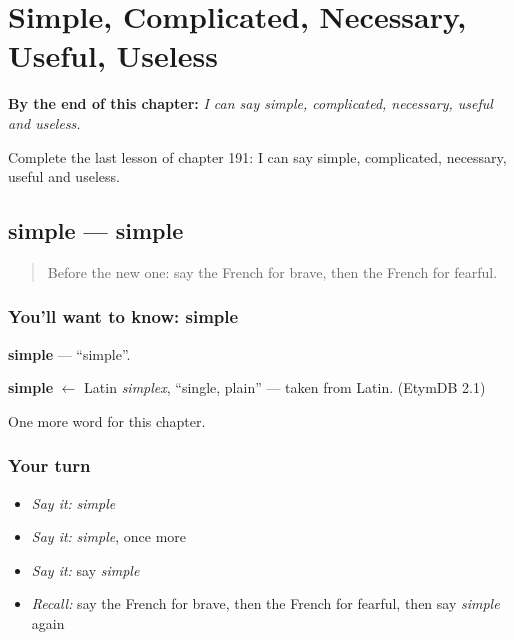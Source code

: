 
\chapter{Simple, Complicated, Necessary, Useful, Useless}
\label{ch:fr-simple-complicated-necessary-useful-useless}

\begin{chapteropening}
\textbf{By the end of this chapter:} \emph{I can say simple, complicated, necessary, useful and useless.}

Complete the last lesson of chapter 191: I can say simple, complicated, necessary, useful and useless.
\end{chapteropening}

\section[simple]{simple — simple}

\label{lesson:FR-C191-simple}



\begin{quote}
Before the new one: say the French for brave, then the French for fearful.
\end{quote}

\subsection*{You'll want to know: simple}
\textbf{simple} — \textquotedblleft{}simple\textquotedblright{}.

\begin{cousinweb}
\textbf{simple} $\leftarrow$ Latin \emph{simplex}, \textquotedblleft{}single, plain\textquotedblright{} — taken from Latin. (EtymDB 2.1)
\end{cousinweb}

\begin{grammarlens}[title={What you've built}]
One more word for this chapter.
\end{grammarlens}

\subsection*{Your turn}
\begin{itemize}
\raggedright
  \item \emph{Say it:} \emph{simple}
  \item \emph{Say it:} \emph{simple}, once more
  \item \emph{Say it:} say \emph{simple}
  \item \emph{Recall:} say the French for brave, then the French for fearful, then say \emph{simple} again
\end{itemize}

